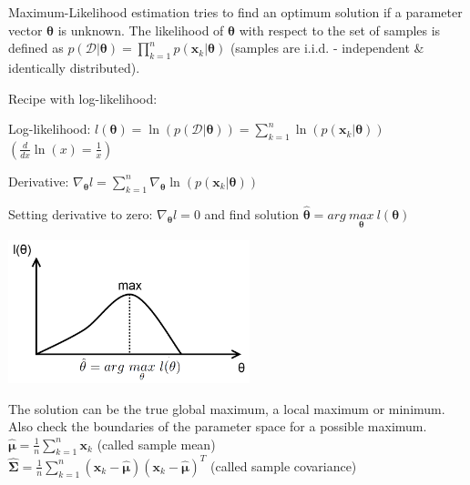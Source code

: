 
  Maximum-Likelihood estimation tries to find an optimum solution if a parameter vector
  $\boldsymbol{\theta}$ is unknown.
  The likelihood of $\boldsymbol{\theta}$ with respect to the set of samples is defined as 
  $p(\mathcal{D} | \boldsymbol{\theta}) = \prod_{k=1}^{n} p(\mathbf{x}_k | \boldsymbol{\theta})$ 
  (samples are i.i.d. - independent \& identically distributed).
  
  \begin{minipage}{12cm}
	  Recipe with log-likelihood:
	  \begin{aufzaehlung}
	    \item Log-likelihood: $l(\boldsymbol{\theta}) = \ln (p(\mathcal{D} | \boldsymbol{\theta}))=\sum\limits_{k=1}^n \ln(p(\mathbf{x}_k | \boldsymbol{\theta}))$ \quad $\left( \frac{d}{dx} \ln(x) = \frac1x \right)$
	    \item Derivative: $\nabla_{\boldsymbol{\theta}} l = 
	      \sum\limits_{k=1}^n \nabla_{\boldsymbol{\theta}}\ln(p(\mathbf{x}_k | \boldsymbol{\theta}))$
	    \item Setting derivative to zero: $\nabla_{\boldsymbol{\theta}} l = 0$ and find solution 
	      $\boldsymbol{\hat{\theta}}=arg~ \underset{\bm{\theta}}{max}~ l(\bm{\theta})$
	  \end{aufzaehlung}
  \end{minipage}
  \begin{minipage}{8cm}
  	\includegraphics[width=7cm]{./images/MaxLikely.png}
  \end{minipage}
  
  The solution can be the true global maximum, a local maximum or minimum. Also check the boundaries of the parameter space for a possible maximum.
  $\boldsymbol{\hat{\mu}} = \frac1n \sum\limits_{k=1}^n \mathbf{x}_k$ (called sample mean)\\
  $\boldsymbol{\hat{\Sigma}} = \frac1n \sum\limits_{k=1}^n 
  (\boldsymbol{x}_k - \boldsymbol{\hat{\mu}})(\boldsymbol{x}_k - \boldsymbol{\hat{\mu}})^T$ (called sample covariance)
  
